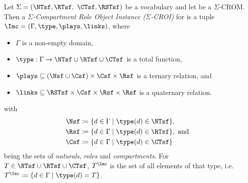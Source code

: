 \begin{definition}
  Let $\Sigma = (\NTsf, \RTsf,$ $\CTsf,\RSTsf)$ be a vocabulary and
  let \MM be a $\Sigma$-CROM.  Then a \emph{$\Sigma$-Compartment Role Object Instance
    ($\Sigma$-CROI)} \I for \Mmc is a tuple $\I=(\Gamma,\type,\plays,\links)$, where
  \begin{itemize}
  \item $\Gamma$ is a non-empty domain,
  \item $\type:\Gamma\to\NTsf\cup\RTsf\cup\CTsf$ is a total function,
  \item $\plays\subseteq(\Nsf\cup\Csf)\times\Csf\times\Rsf$ is a ternary relation, and
  \item $\links\subseteq\RSTsf\times\Csf\times\Rsf\times\Rsf$ is a quaternary relation.
  \end{itemize}
  with 
  \begin{align*}
  \Nsf & \coloneqq \{d \in \Gamma \mid \type(d) \in \NTsf\}, \\
  \Rsf & \coloneqq \{d \in \Gamma \mid \type(d) \in \RTsf\}, \text{ and} \\
  \Csf & \coloneqq \{d \in \Gamma \mid \type(d) \in \CTsf\} 
  \end{align*}
  being the sets of \emph{naturals}, \emph{roles} and \emph{compartments}. For
  $T \in \NTsf\cup\RTsf\cup\CTsf$, $T^{\I}$ is the set of all elements of that type, i.e.\
  $T^{\I} \coloneqq \{d \in \Gamma \mid \type(d) = T\}$.


\end{definition}
